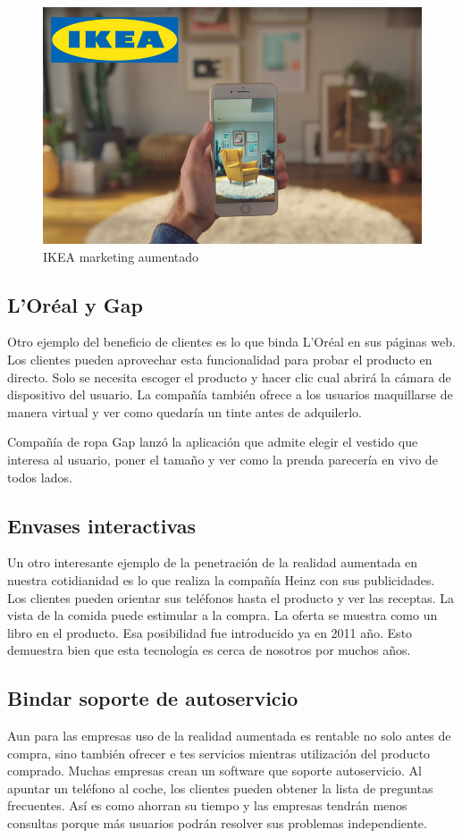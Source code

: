\documentclass[a4paper,11pt]{scrartcl}
\begin{document}
\begin{figure}[h]
    \centering
    \includegraphics[width=0.7\linewidth]{mixedmarketingikea}
    \caption{IKEA marketing aumentado \cite{imgmixedmarketingikea}}
\end{figure}

\subsection{L'Oréal y Gap}
Otro ejemplo del beneficio de clientes es lo que binda L'Oréal en sus páginas web\cite{loreal}. Los clientes pueden aprovechar esta funcionalidad para probar el producto en directo. Solo se necesita escoger el producto y hacer clic cual abrirá la cámara de dispositivo del usuario. La compañía también ofrece a los usuarios maquillarse de manera virtual y ver como quedaría un tinte antes de adquilerlo.

\par Compañía de ropa Gap lanzó la aplicación\cite{gap} que admite elegir el vestido que interesa al usuario, poner el tamaño y ver como la prenda parecería en vivo de todos lados.

\subsection{Envases interactivas}
Un otro interesante ejemplo de la penetración de la realidad aumentada en nuestra cotidianidad es lo que realiza la compañía Heinz\cite{heinz} con sus publicidades. Los clientes pueden orientar sus teléfonos hasta el producto y ver las receptas. La vista de la comida puede estimular a la compra. La oferta se muestra como un libro en el producto. Esa posibilidad fue introducido ya en 2011 año. Esto demuestra bien que esta tecnología es cerca de nosotros por muchos años.

\subsection{Bindar soporte de autoservicio}
Aun para las empresas uso de la realidad aumentada es rentable no solo antes de compra, sino también ofrecer e tes servicios mientras utilización del producto comprado. Muchas empresas crean un software que soporte autoservicio. Al apuntar un teléfono al coche, los clientes pueden obtener la lista de preguntas frecuentes. Así es como ahorran su tiempo y las empresas tendrán menos consultas porque más usuarios podrán resolver sus problemas independiente.
\end{document}
